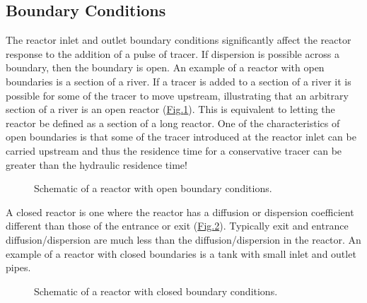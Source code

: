 \documentclass[letterpaper,10pt,english]{sphinxmanual}
\let\sphinxpxdimen\pdfpxdimen\else\newdimen\sphinxpxdimen
\begin{document}
\subsection{Boundary Conditions}
\label{\detokenize{Reactor_Characteristics/Reactor_Characteristics:boundary-conditions}}
The reactor inlet and outlet boundary conditions significantly affect the reactor response to the addition of a pulse of tracer. If dispersion is possible across a boundary, then the boundary is open. An example of a reactor with open boundaries is a section of a river. If a tracer is added to a section of a river it is possible for some of the tracer to move upstream, illustrating that an arbitrary section of a river is an open reactor (\hyperref[\detokenize{Reactor_Characteristics/Reactor_Characteristics:figure-open-boundaries}]{Fig.\@ \ref{\detokenize{Reactor_Characteristics/Reactor_Characteristics:figure-open-boundaries}}}). This is equivalent to letting the reactor be defined as a section of a long reactor. One of the characteristics of open boundaries is that some of the tracer introduced at the reactor inlet can be carried upstream and thus the residence time for a conservative tracer can be greater than the hydraulic residence time!

\begin{figure}[htbp]
\centering
\capstart

\noindent\sphinxincludegraphics[width=300\sphinxpxdimen]{{open_boundaries}.png}
\caption{Schematic of a reactor with open boundary conditions.}\label{\detokenize{Reactor_Characteristics/Reactor_Characteristics:id1}}\label{\detokenize{Reactor_Characteristics/Reactor_Characteristics:figure-open-boundaries}}\end{figure}

A closed reactor is one where the reactor has a diffusion or dispersion coefficient different than those of the entrance or exit (\hyperref[\detokenize{Reactor_Characteristics/Reactor_Characteristics:figure-closed-boundaries}]{Fig.\@ \ref{\detokenize{Reactor_Characteristics/Reactor_Characteristics:figure-closed-boundaries}}}).  Typically exit and entrance diffusion/dispersion are much less than the diffusion/dispersion in the reactor. An example of a reactor with closed boundaries is a tank with small inlet and outlet pipes.

\begin{figure}[htbp]
\centering
\capstart

\noindent\sphinxincludegraphics[width=300\sphinxpxdimen]{{closed_boundaries}.png}
\caption{Schematic of a reactor with closed boundary conditions.}\label{\detokenize{Reactor_Characteristics/Reactor_Characteristics:id2}}\label{\detokenize{Reactor_Characteristics/Reactor_Characteristics:figure-closed-boundaries}}\end{figure}
\end{document}
